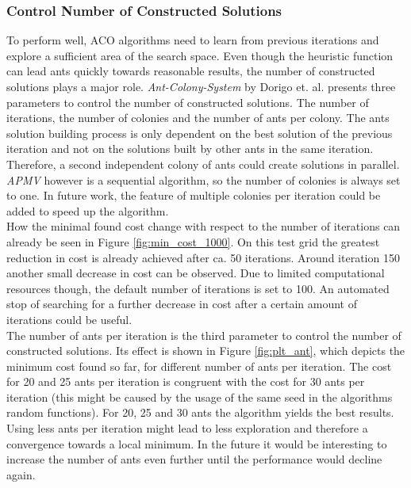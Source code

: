 %
%
%
%

\subsubsection{Control Number of Constructed Solutions}\label{constructed_solutions}
To perform well, ACO algorithms need to learn from previous iterations and explore a sufficient area of the search space. Even though the heuristic function can lead ants quickly towards reasonable results, the number of constructed solutions plays a major role. \textit{Ant-Colony-System} \cite{ant_coloy_system} by Dorigo et. al. presents three parameters to control the number of constructed solutions. The number of iterations, the number of colonies and the number of ants per colony. The ants solution building process is only dependent on the best solution of the previous iteration and not on the solutions built by other ants in the same iteration. Therefore, a second independent colony of ants could create solutions in parallel. \textit{APMV} however is a sequential algorithm, so the number of colonies is always set to one. In future work, the feature of multiple colonies per iteration could be added to speed up the algorithm. \\
How the minimal found cost change with respect to the number of iterations can already be seen in Figure \ref{fig:min_cost_1000}. On this test grid the greatest reduction in cost is already achieved after ca. 50 iterations. Around iteration 150 another small decrease in cost can be observed. Due to limited computational resources though, the default number of iterations is set to 100. An automated stop of searching for a further decrease in cost after a certain amount of iterations could be useful.\\
The number of ants per iteration is the third parameter to control the number of constructed solutions. Its effect is shown in Figure \ref{fig:plt_ant}, which depicts the minimum cost found so far, for different number of ants per iteration. The cost for 20 and 25 ants per iteration is congruent with the cost for 30 ants per iteration (this might be caused by the usage of the same seed in the algorithms random functions). For 20, 25 and 30 ants the algorithm yields the best results. Using less ants per iteration might lead to less exploration and therefore a convergence towards a local minimum. In the future it would be interesting to increase the number of ants even further until the performance would decline again.

